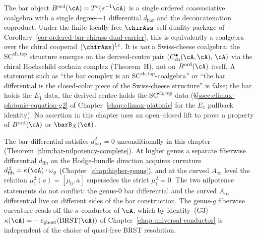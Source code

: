 \begin{remark}
\label{rem:bar-not-sc-coalgebra}
%
%
The bar object $B^{\mathrm{ord}}(\cA) = T^c(s^{-1}\bar\cA)$ is a
single ordered coassociative coalgebra with a single degree-$+1$
differential $d_{\mathrm{bar}}$ and the deconcatenation coproduct. Under
the finite locally free \(\chirAss\)-self-duality package of
Corollary~\ref{cor:ordered-bar-chirass-dual-carrier}, this is
equivalently a coalgebra over the chiral cooperad
\((\chirAss)^{!,c}\). It is \emph{not} a Swiss-cheese coalgebra:
the $\mathrm{SC}^{\mathrm{ch,top}}$ structure emerges on
the derived-centre pair
$(C^\bullet_{\mathrm{ch}}(\cA,\cA),\,\cA)$ via the chiral Hochschild
cochain complex (Theorem~H), not on $B^{\mathrm{ord}}(\cA)$ itself.
A statement such as ``the bar complex is an
$\mathrm{SC}^{\mathrm{ch,top}}$-coalgebra'' or ``the bar differential is
the closed-color piece of the Swiss-cheese structure'' is false; the
bar holds the $E_1$ data, the derived centre holds the
$\mathrm{SC}^{\mathrm{ch,top}}$ data
(\S\ref{ssec:climax-platonic-equation-g2} of
Chapter~\ref{chap:climax-platonic} for the $E_1$ pullback identity).
No assertion in this chapter uses an open--closed lift to prove a
property of $B^{\mathrm{ord}}(\cA)$ or $\barB_X(\cA)$.
\end{remark}

\begin{remark}
\label{rem:curved-fiberwise-not-bar-d-squared}
%
The bar differential satisfies $d_{\mathrm{bar}}^2 = 0$ unconditionally
in this chapter (Theorem~\ref{thm:bar-nilpotency-complete}). At higher
genus a separate fiberwise differential $d_{\mathrm{fib}}$ on the
Hodge-bundle direction acquires curvature
$d_{\mathrm{fib}}^{\,2} = \kappa(\cA) \cdot \omega_g$
(Chapter~\ref{chap:higher-genus}), and at the curved $A_\infty$
level the relation $\mu_1^2(a) = [\mu_0, a]$ supersedes the strict
$\mu_1^2 = 0$. The two nilpotence statements
do not conflict: the genus-$0$ bar differential and the curved
$A_\infty$ differential live on different sides of the bar
construction. The genus-$g$ fiberwise curvature reads off the
$\kappa$-conductor of $\cA$, which by identity~\textup{(G3)}
$\kappa(\cA) = -\,c_{\mathrm{ghost}}(\BRST(\cA))$ of
Chapter~\ref{chap:universal-conductor} is independent of the choice of
quasi-free BRST resolution.
\end{remark}

